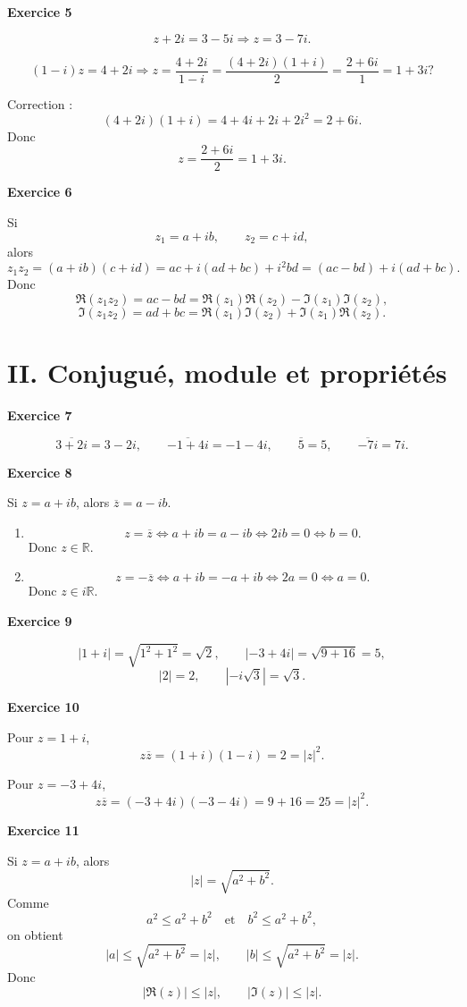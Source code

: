 \documentclass[11pt,a4paper]{article}
\newcommand{\R}{\mathbb{R}}
\begin{document}
\textbf{Exercice 5}

\[
z+2i=3-5i \Longrightarrow z=3-7i.
\]

\[
(1-i)z=4+2i \Longrightarrow z=\frac{4+2i}{1-i}
=\frac{(4+2i)(1+i)}{2}
=\frac{2+6i}{1}=1+3i? 
\]

Correction :
\[
(4+2i)(1+i)=4+4i+2i+2i^2=2+6i.
\]
Donc
\[
z=\frac{2+6i}{2}=1+3i.
\]

\textbf{Exercice 6}

Si
\[
z_1=a+ib,\qquad z_2=c+id,
\]
alors
\[
z_1z_2=(a+ib)(c+id)=ac+i(ad+bc)+i^2bd=(ac-bd)+i(ad+bc).
\]
Donc
\[
\Re(z_1z_2)=ac-bd=\Re(z_1)\Re(z_2)-\Im(z_1)\Im(z_2),
\]
\[
\Im(z_1z_2)=ad+bc=\Re(z_1)\Im(z_2)+\Im(z_1)\Re(z_2).
\]

\section*{II. Conjugué, module et propriétés}

\textbf{Exercice 7}

\[
\overline{3+2i}=3-2i,\qquad \overline{-1+4i}=-1-4i,
\qquad \overline{5}=5,\qquad \overline{-7i}=7i.
\]

\textbf{Exercice 8}

Si \(z=a+ib\), alors \(\overline z=a-ib\).

\begin{enumerate}[label=\alph*)]
    \item
    \[
    z=\overline z
    \Longleftrightarrow a+ib=a-ib
    \Longleftrightarrow 2ib=0
    \Longleftrightarrow b=0.
    \]
    Donc \(z\in\R\).

    \item
    \[
    z=-\overline z
    \Longleftrightarrow a+ib=-a+ib
    \Longleftrightarrow 2a=0
    \Longleftrightarrow a=0.
    \]
    Donc \(z\in i\R\).
\end{enumerate}

\textbf{Exercice 9}

\[
|1+i|=\sqrt{1^2+1^2}=\sqrt{2},
\qquad
|-3+4i|=\sqrt{9+16}=5,
\]
\[
|2|=2,
\qquad
|-i\sqrt3|=\sqrt3.
\]

\textbf{Exercice 10}

Pour \(z=1+i\),
\[
z\overline z=(1+i)(1-i)=2=|z|^2.
\]

Pour \(z=-3+4i\),
\[
z\overline z=(-3+4i)(-3-4i)=9+16=25=|z|^2.
\]

\textbf{Exercice 11}

Si \(z=a+ib\), alors
\[
|z|=\sqrt{a^2+b^2}.
\]
Comme
\[
a^2\le a^2+b^2 \quad \text{et} \quad b^2\le a^2+b^2,
\]
on obtient
\[
|a|\le \sqrt{a^2+b^2}=|z|,
\qquad
|b|\le \sqrt{a^2+b^2}=|z|.
\]
Donc
\[
|\Re(z)|\le |z|,
\qquad
|\Im(z)|\le |z|.
\]
\end{document}
